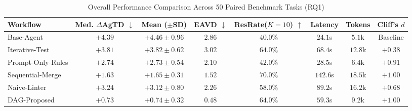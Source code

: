 \begin{table}[t]
\centering
\caption{Overall Performance Comparison Across 50 Paired Benchmark Tasks (RQ1)}
\label{tab:rq1_results}
\begin{tabular}{lccccccc}
\toprule
\textbf{Workflow} & \textbf{Med. $\Delta$AgTD} $\downarrow$ & \textbf{Mean ($\pm$SD)} & \textbf{EAVD} $\downarrow$ & \textbf{ResRate($K=10$)} $\uparrow$ & \textbf{Latency} & \textbf{Tokens} & \textbf{Cliff's $d$} \\
\midrule
Base-Agent & $+4.39$ & $+4.46 \pm 0.96$ & $2.86$ & $40.0\%$ & $24.1$s & $5.1$k & Baseline \\
Iterative-Test & $+3.81$ & $+3.82 \pm 0.62$ & $3.02$ & $64.0\%$ & $68.4$s & $12.8$k & $+0.38$ \\
Prompt-Only-Rules & $+2.74$ & $+2.73 \pm 0.54$ & $2.10$ & $42.0\%$ & $28.5$s & $6.4$k & $+0.91$ \\
Sequential-Merge & $+1.63$ & $+1.65 \pm 0.31$ & $1.52$ & $70.0\%$ & $142.6$s & $18.5$k & $+1.00$ \\
Naive-Linter & $+3.24$ & $+3.12 \pm 0.80$ & $2.26$ & $58.0\%$ & $89.2$s & $16.2$k & $+0.68$ \\
DAG-Proposed & $+0.73$ & $+0.74 \pm 0.32$ & $0.48$ & $64.0\%$ & $59.3$s & $9.2$k & $+1.00$ \\
\bottomrule
\end{tabular}
\end{table}
